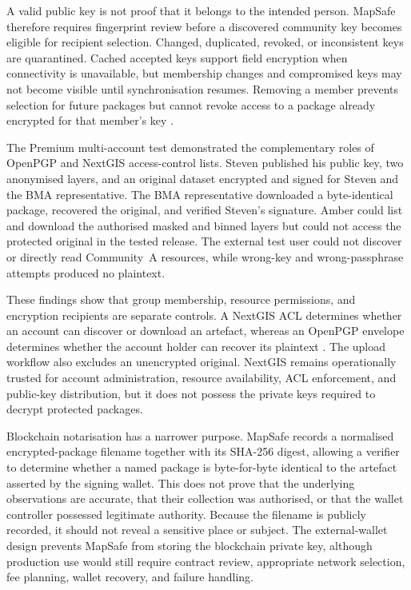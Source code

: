 \documentclass[]{interact}
\begin{document}
A valid public key is not proof that it belongs to the intended person. MapSafe therefore requires fingerprint review before a discovered community key becomes eligible for recipient selection. Changed, duplicated, revoked, or inconsistent keys are quarantined. Cached accepted keys support field encryption when connectivity is unavailable, but membership changes and compromised keys may not become visible until synchronisation resumes. Removing a member prevents selection for future packages but cannot revoke access to a package already encrypted for that member's key \citep{wouters2024openpgp}.

The Premium multi-account test demonstrated the complementary roles of OpenPGP and NextGIS access-control lists. Steven published his public key, two anonymised layers, and an original dataset encrypted and signed for Steven and the BMA representative. The BMA representative downloaded a byte-identical package, recovered the original, and verified Steven's signature. Amber could list and download the authorised masked and binned layers but could not access the protected original in the tested release. The external test user could not discover or directly read Community~A resources, while wrong-key and wrong-passphrase attempts produced no plaintext.

These findings show that group membership, resource permissions, and encryption recipients are separate controls. A NextGIS ACL determines whether an account can discover or download an artefact, whereas an OpenPGP envelope determines whether the account holder can recover its plaintext \citep{nextgis2026permissions,wouters2024openpgp}. The upload workflow also excludes an unencrypted original. NextGIS remains operationally trusted for account administration, resource availability, ACL enforcement, and public-key distribution, but it does not possess the private keys required to decrypt protected packages.

Blockchain notarisation has a narrower purpose. MapSafe records a normalised encrypted-package filename together with its SHA-256 digest, allowing a verifier to determine whether a named package is byte-for-byte identical to the artefact asserted by the signing wallet. This does not prove that the underlying observations are accurate, that their collection was authorised, or that the wallet controller possessed legitimate authority. Because the filename is publicly recorded, it should not reveal a sensitive place or subject. The external-wallet design prevents MapSafe from storing the blockchain private key, although production use would still require contract review, appropriate network selection, fee planning, wallet recovery, and failure handling.
\end{document}
